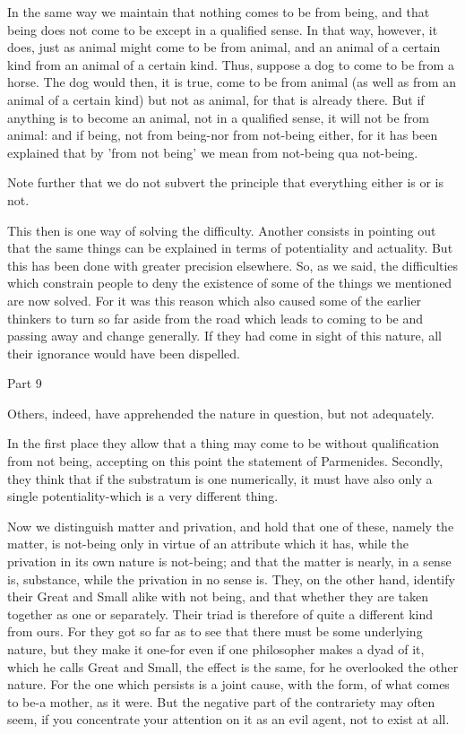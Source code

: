 In the same way we maintain that nothing comes to be from being, and
that being does not come to be except in a qualified sense. In that
way, however, it does, just as animal might come to be from animal,
and an animal of a certain kind from an animal of a certain kind.
Thus, suppose a dog to come to be from a horse. The dog would then,
it is true, come to be from animal (as well as from an animal of a
certain kind) but not as animal, for that is already there. But if
anything is to become an animal, not in a qualified sense, it will
not be from animal: and if being, not from being-nor from not-being
either, for it has been explained that by 'from not being' we mean
from not-being qua not-being. 

Note further that we do not subvert the principle that everything
either is or is not. 

This then is one way of solving the difficulty. Another consists in
pointing out that the same things can be explained in terms of potentiality
and actuality. But this has been done with greater precision elsewhere.
So, as we said, the difficulties which constrain people to deny the
existence of some of the things we mentioned are now solved. For it
was this reason which also caused some of the earlier thinkers to
turn so far aside from the road which leads to coming to be and passing
away and change generally. If they had come in sight of this nature,
all their ignorance would have been dispelled. 

Part 9

Others, indeed, have apprehended the nature in question, but not adequately.

In the first place they allow that a thing may come to be without
qualification from not being, accepting on this point the statement
of Parmenides. Secondly, they think that if the substratum is one
numerically, it must have also only a single potentiality-which is
a very different thing. 

Now we distinguish matter and privation, and hold that one of these,
namely the matter, is not-being only in virtue of an attribute which
it has, while the privation in its own nature is not-being; and that
the matter is nearly, in a sense is, substance, while the privation
in no sense is. They, on the other hand, identify their Great and
Small alike with not being, and that whether they are taken together
as one or separately. Their triad is therefore of quite a different
kind from ours. For they got so far as to see that there must be some
underlying nature, but they make it one-for even if one philosopher
makes a dyad of it, which he calls Great and Small, the effect is
the same, for he overlooked the other nature. For the one which persists
is a joint cause, with the form, of what comes to be-a mother, as
it were. But the negative part of the contrariety may often seem,
if you concentrate your attention on it as an evil agent, not to exist
at all. 

